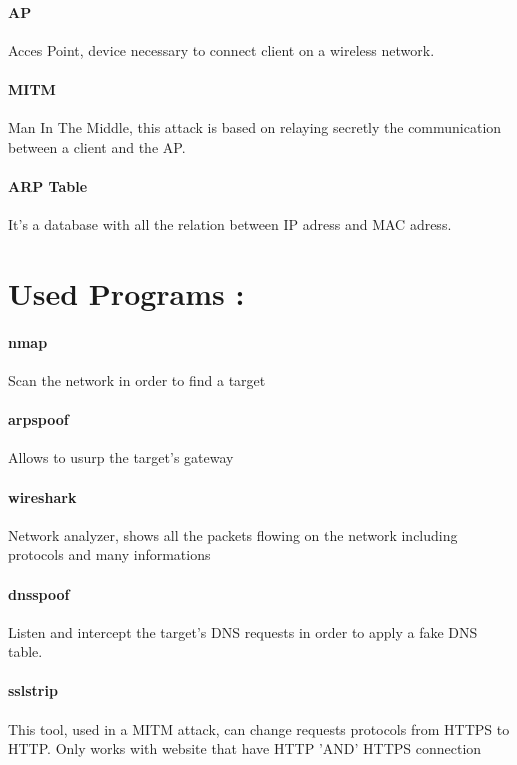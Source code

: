 \documentclass[a4paper, 11pt, oneside]{article}
\begin{document}
\paragraph{AP}
Acces Point, device necessary to connect client on a wireless network.\\

\paragraph{MITM}
Man In The Middle, this attack is based on relaying secretly the communication between a client and the AP.\\

\paragraph{ARP Table}
It's a database with all the relation between IP adress and MAC adress.\\

\section*{Used Programs :}
\paragraph{nmap}
Scan the network in order to find a target\\

\paragraph{arpspoof}
Allows to usurp the target's gateway\\

\paragraph{wireshark}
Network analyzer, shows all the packets flowing on the network including protocols and many informations\\

\paragraph{dnsspoof}
Listen and intercept the target's DNS requests in order to apply a fake DNS table.\\

\paragraph{sslstrip}
This tool, used in a MITM attack, can change requests protocols from HTTPS to HTTP. Only works with website that have HTTP 'AND' HTTPS connection\\
\end{document}
